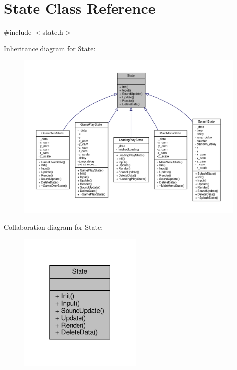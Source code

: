 \hypertarget{classState}{}\section{State Class Reference}
\label{classState}


{\ttfamily \#include $<$state.\+h$>$}



Inheritance diagram for State\+:
\nopagebreak
\begin{figure}[H]
\begin{center}
\leavevmode
\includegraphics[width=350pt]{classState__inherit__graph}
\end{center}
\end{figure}


Collaboration diagram for State\+:
\nopagebreak
\begin{figure}[H]
\begin{center}
\leavevmode
\includegraphics[width=171pt]{classState__coll__graph}
\end{center}
\end{figure}
